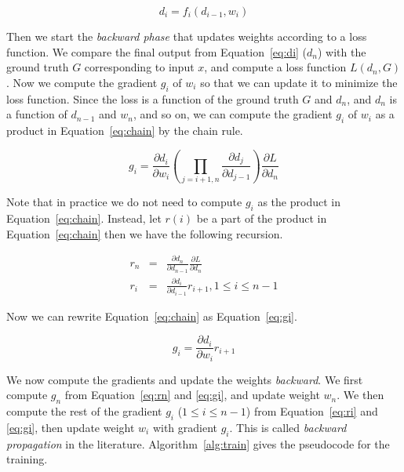 \begin{equation}
d_i = f_i(d_{i-1}, w_i) \label{eq:di}
\end{equation}

Then we start the {\em backward phase} that updates weights according to a loss function.
We compare the final output from Equation~\ref{eq:di} ($d_n$) with the ground truth $G$ corresponding to input $x$, and compute a loss function $L(d_n, G)$.
Now we compute the gradient $g_i$ of $w_i$ so that we can update it to minimize the loss function.
Since the loss is a function of the ground truth $G$ and $d_n$, and $d_n$ is a function of $d_{n-1}$ and $w_n$, and so on, we can compute the gradient $g_i$ of $w_i$ as a product in Equation~\ref{eq:chain} by the chain rule.

\begin{equation}
g_i = \frac{\partial d_i}{\partial w_i} (\prod_{j=i+1,n} \frac{\partial d_j}{\partial d_{j-1}}) \frac{\partial L}{\partial d_{n}} \label{eq:chain}
\end{equation}

Note that in practice we do not need to compute $g_i$ as the product in Equation~\ref{eq:chain}.
Instead, let $r(i)$ be a part of the product in Equation~\ref{eq:chain} then we have the following recursion.

\begin{eqnarray}
r_n & = & \frac{\partial d_n}{\partial d_{n-1}} \frac{\partial L}{\partial d_{n}}  \label{eq:rn} \\
r_i & = & \frac{\partial d_i}{\partial d_{i-1}} r_{i+1}, 1 \leq i \leq n - 1 \label{eq:ri}
\end{eqnarray}

Now we can rewrite Equation~\ref{eq:chain} as Equation~\ref{eq:gi}.

\begin{equation}
g_i = \frac{\partial d_i}{\partial w_i} r_{i+1} \label{eq:gi}
\end{equation}

We now compute the gradients and update the weights {\em backward}.
We first compute $g_n$ from Equation~\ref{eq:rn} and \ref{eq:gi}, and update weight $w_n$.
We then compute the rest of the gradient $g_i$ ($1 \leq i \leq n - 1$) from Equation~\ref{eq:ri} and \ref{eq:gi}, then update weight $w_i$ with gradient $g_i$.  
This is called {\em backward propagation} in the literature.
Algorithm~\ref{alg:train} gives the pseudocode for the training.

